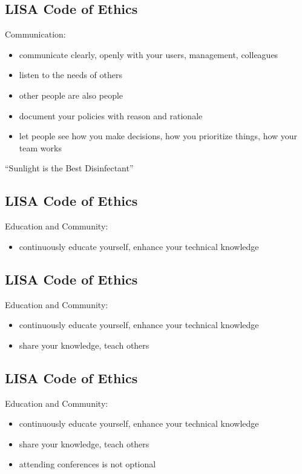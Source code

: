 \documentclass[xga]{xdvislides}
\begin{document}
\subsection{LISA Code of Ethics}
Communication:
\begin{itemize}
	\item communicate clearly, openly with your users, management, colleagues
	\item listen to the needs of others
	\item other people are also people
	\item document your policies with reason and rationale
	\item let people see how you make decisions,
		how you prioritize things, how your team works
\end{itemize}
\vspace{.5in}
``Sunlight is the Best Disinfectant''

\subsection{LISA Code of Ethics}
Education and Community:
\begin{itemize}
	\item continuously educate yourself, enhance your technical knowledge
\end{itemize}

\subsection{LISA Code of Ethics}
Education and Community:
\begin{itemize}
	\item continuously educate yourself, enhance your technical knowledge
	\item share your knowledge, teach others
\end{itemize}

\subsection{LISA Code of Ethics}
Education and Community:
\begin{itemize}
	\item continuously educate yourself, enhance your technical knowledge
	\item share your knowledge, teach others
	\item attending conferences is not optional
\end{itemize}
\end{document}
